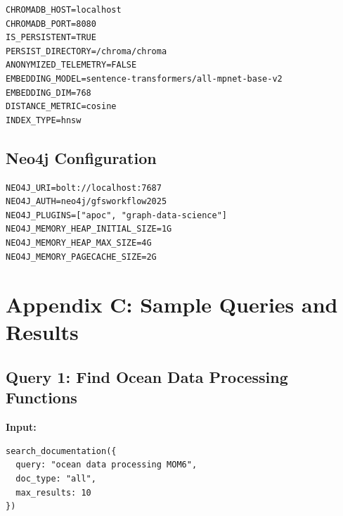 \documentclass[11pt,letterpaper]{article}
\begin{document}
\begin{lstlisting}[caption=ChromaDB Docker environment]
CHROMADB_HOST=localhost
CHROMADB_PORT=8080
IS_PERSISTENT=TRUE
PERSIST_DIRECTORY=/chroma/chroma
ANONYMIZED_TELEMETRY=FALSE
EMBEDDING_MODEL=sentence-transformers/all-mpnet-base-v2
EMBEDDING_DIM=768
DISTANCE_METRIC=cosine
INDEX_TYPE=hnsw
\end{lstlisting}

\subsection{Neo4j Configuration}

\begin{lstlisting}[caption=Neo4j Docker environment]
NEO4J_URI=bolt://localhost:7687
NEO4J_AUTH=neo4j/gfsworkflow2025
NEO4J_PLUGINS=["apoc", "graph-data-science"]
NEO4J_MEMORY_HEAP_INITIAL_SIZE=1G
NEO4J_MEMORY_HEAP_MAX_SIZE=4G
NEO4J_MEMORY_PAGECACHE_SIZE=2G
\end{lstlisting}

\section{Appendix C: Sample Queries and Results}

\subsection{Query 1: Find Ocean Data Processing Functions}

\textbf{Input:}
\begin{lstlisting}
search_documentation({
  query: "ocean data processing MOM6",
  doc_type: "all",
  max_results: 10
})
\end{lstlisting}
\end{document}
